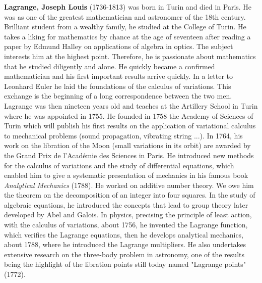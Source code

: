 \textbf{Lagrange, Joseph Louis} (1736-1813) was born in Turin and died in Paris. He was as one of the greatest mathematician and astronomer of the 18th century. Brilliant student from a wealthy family, he studied at the College of Turin. He takes a liking for mathematics by chance at the age of seventeen after reading a paper by Edmund Halley on applications of algebra in optics. The subject interests him at the highest point. Therefore, he is passionate about mathematics that he studied diligently and alone. He quickly became a confirmed mathematician and his first important results arrive quickly. In a letter to Leonhard Euler he laid the foundations of the calculus of variations. This exchange is the beginning of a long correspondence between the two men. Lagrange was then nineteen years old and teaches at the Artillery School in Turin where he was appointed in 1755. He founded in 1758 the Academy of Sciences of Turin which will publish his first results on the application of variational calculus to mechanical problems (sound propagation, vibrating string ...). In 1764, his work on the libration of the Moon (small variations in its orbit) are awarded by the Grand Prix de l'Académie des Sciences in Paris. He introduced new methods for the calculus of variations and the study of differential equations, which enabled him to give a systematic presentation of mechanics in his famous book \textit{Analytical Mechanics} (1788). He worked on additive number theory. We owe him the theorem on the decomposition of an integer into four squares. In the study of algebraic equations, he introduced the concepts that lead to group theory later developed by Abel and Galois. In physics, precising the principle of least action, with the calculus of variations, about 1756, he invented the Lagrange function, which verifies the Lagrange equations, then he develops analytical mechanics, about 1788, where he introduced the Lagrange multipliers. He also undertakes extensive research on the three-body problem in astronomy, one of the results being the highlight of the libration points still today named "Lagrange points" (1772).

